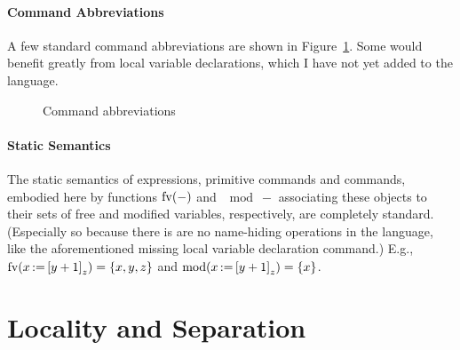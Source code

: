 \documentclass[11pt]{report}
\begin{document}
\paragraph{Command Abbreviations} A few standard command abbreviations are shown in Figure~\ref{fig:command-abbreviations}. Some would benefit greatly from local variable declarations, which I have not yet added to the language. 

\begin{figure}[ht]
	\centering
	\caption{\label{fig:command-abbreviations} Command abbreviations}
\end{figure}

\paragraph{Static Semantics} The static semantics of expressions, primitive commands and commands, embodied here by functions $\mathrm{fv}(-)$ and $\mod{-}$ associating these objects to their sets of free and modified variables, respectively, are completely standard. (Especially so because there is are no name-hiding operations in the language, like the aforementioned missing local variable declaration command.) E.g., $\mathrm{fv}(x \operatorname{:\!=} \left[ y+1 \right]_z) = \left\lbrace x,y,z \right\rbrace$ and $\mathrm{mod}(x \operatorname{:\!=} \left[ y+1 \right]_z) = \left\lbrace x \right\rbrace$.  

\section{Locality and Separation}
\end{document}
